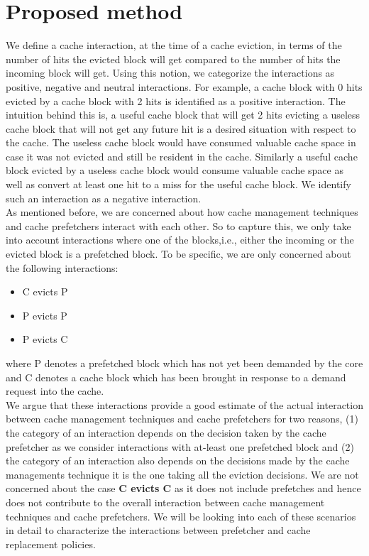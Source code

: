 \chapter{Proposed method}
We define a cache interaction, at the time of a cache eviction, in terms of the number of hits the evicted block will get compared to the number of hits the incoming block will get. Using this notion, we categorize the interactions as positive, negative and neutral interactions. For example, a cache block with 0 hits evicted by a cache block with 2 hits is identified as a positive interaction. The intuition behind this is, a useful cache block that will get 2 hits evicting a useless cache block that will not get any future hit is a desired situation with respect to the cache. The useless cache block would have consumed valuable cache space in case it was not evicted and still be resident in the cache. Similarly a useful cache block evicted by a useless cache block would consume valuable cache space as well as convert at least one hit to a miss for the useful cache block. We identify such an interaction as a negative interaction.
\\
As mentioned before, we are concerned about how cache management techniques and cache prefetchers interact with each other. So to capture this, we only take into account interactions where one of the blocks,i.e., either the incoming or the evicted block is a prefetched block. To be specific, we are only concerned about the following interactions:
 \begin{itemize}
        \item C evicts P
        \item P evicts P
        \item P evicts C
\end{itemize}
where P denotes a prefetched block which has not yet been demanded by the core and C denotes a cache block which has been brought in response to a demand request into the cache. 
\\
We argue that these interactions provide a good estimate of the actual interaction between cache management techniques and cache prefetchers for two reasons, (1) the category of an interaction depends on the decision taken by the cache prefetcher as we consider interactions with at-least one prefetched block and (2) the category of an interaction also depends on the decisions made by the cache managements technique it is the one taking all the eviction decisions. We are not concerned about the case \textbf{C evicts C} as it does not include prefetches and hence does not contribute to the overall interaction between cache management techniques and cache prefetchers. We will be looking into each of these scenarios in detail to characterize the interactions between prefetcher and cache replacement policies. 

